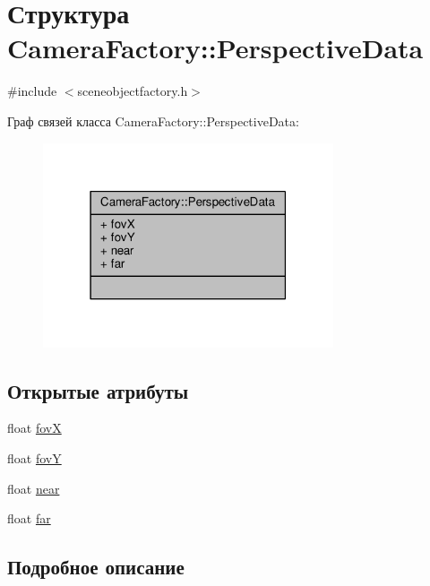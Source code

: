 \hypertarget{struct_camera_factory_1_1_perspective_data}{}\section{Структура Camera\+Factory\+:\+:Perspective\+Data}
\label{struct_camera_factory_1_1_perspective_data}


{\ttfamily \#include $<$sceneobjectfactory.\+h$>$}



Граф связей класса Camera\+Factory\+:\+:Perspective\+Data\+:
\nopagebreak
\begin{figure}[H]
\begin{center}
\leavevmode
\includegraphics[width=243pt]{db/d84/struct_camera_factory_1_1_perspective_data__coll__graph}
\end{center}
\end{figure}
\subsection*{Открытые атрибуты}
\begin{DoxyCompactItemize}
\item 
float \hyperlink{struct_camera_factory_1_1_perspective_data_adad856561ffc92f96a2fe6a834f9baf0}{fovX}
\item 
float \hyperlink{struct_camera_factory_1_1_perspective_data_aee0e522e300405859de7ef8d32b63249}{fovY}
\item 
float \hyperlink{struct_camera_factory_1_1_perspective_data_a2d3bcbd8b639a6ace7a79f91f0e71952}{near}
\item 
float \hyperlink{struct_camera_factory_1_1_perspective_data_a7a69342f752826f9440482ddce959a2f}{far}
\end{DoxyCompactItemize}


\subsection{Подробное описание}


